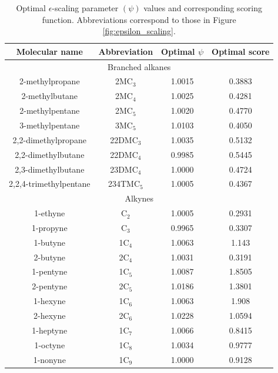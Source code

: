 \documentclass[journal=jctc,manuscript=article]{achemso}
\begin{document}
\begin{table}[htb!]
	\caption{Optimal $\epsilon$-scaling parameter $(\psi)$ values and corresponding scoring function. Abbreviations correspond to those in Figure \ref{fig:epsilon_scaling}.} \label{SI tab: psi opt}
	\begin{center}
		\begin{tabular}{|c|c|c|c|}
			\hline
			Molecular name & Abbreviation & Optimal $\psi$ & Optimal score \\ \hline
			\multicolumn{4}{|c|}{Branched alkanes} \\ \hline
			2-methylpropane & 2MC$_3$ & 1.0015 & 0.3883 \\
			2-methylbutane & 2MC$_4$ & 1.0025 & 0.4281 \\
			2-methylpentane & 2MC$_5$ & 1.0020 & 0.4770 \\
			3-methylpentane & 3MC$_5$ & 1.0103 & 0.4050 \\
			2,2-dimethylpropane & 22DMC$_3$ & 1.0035 & 0.5132 \\
			2,2-dimethylbutane & 22DMC$_4$ & 0.9985 & 0.5445 \\
			2,3-dimethylbutane & 23DMC$_4$ & 1.0000 & 0.4724 \\
			2,2,4-trimethylpentane & 234TMC$_5$ & 1.0005 & 0.4367 \\ \hline	
			\multicolumn{4}{|c|}{Alkynes} \\ \hline
			1-ethyne & C$_2$ & 1.0005 & 0.2931 \\
			1-propyne & C$_3$ & 0.9965 & 0.3307 \\
			1-butyne & 1C$_4$ & 1.0063 & 1.143 \\
			2-butyne & 2C$_4$ & 1.0031 & 0.3191 \\
			1-pentyne & 1C$_5$ & 1.0087 & 1.8505 \\
			2-pentyne & 2C$_5$ & 1.0186 & 1.3801 \\
			1-hexyne & 1C$_6$ & 1.0063 & 1.908 \\
			2-hexyne & 2C$_6$ & 1.0228 & 1.0594 \\
			1-heptyne & 1C$_7$ & 1.0066 & 0.8415 \\
			1-octyne & 1C$_8$ & 1.0034 & 0.9777 \\
			1-nonyne & 1C$_9$ & 1.0000 & 0.9128 \\
			\hline
		\end{tabular}
	\end{center}
\end{table}

\newpage
\clearpage
\end{document}
